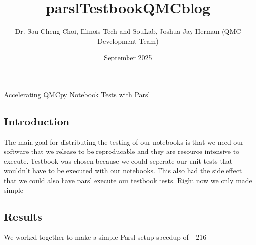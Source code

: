 \title{parslTestbookQMCblog}
\author{Dr. Sou-Cheng Choi, Illinois Tech and  SouLab, Joshua Jay Herman (QMC Development Team)}
\date{September 2025}

\maketitle
Accelerating QMCpy Notebook Tests with Parsl
\subsection{Introduction}

The main goal for distributing the testing of our notebooks is that we need our software that we release to be reproducable and they are resource intensive to execute. Testbook was chosen because we could seperate our unit tests that wouldn't have to be executed with our notebooks. This also had the side effect that we could also have parsl execute our testbook tests. Right now we only made simple 

\subsection{Results}
We worked together to make a simple Parsl setup speedup of +216%
